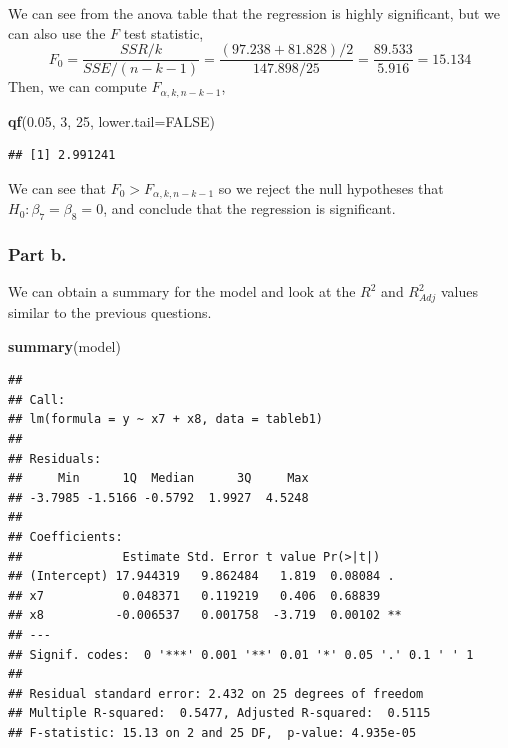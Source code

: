 \documentclass[
  11pt,
]{article}
\newenvironment{Shaded}{\begin{snugshade}}{\end{snugshade}}
\newcommand{\AttributeTok}[1]{\textcolor[rgb]{0.13,0.29,0.53}{#1}}
\newcommand{\ConstantTok}[1]{\textcolor[rgb]{0.56,0.35,0.01}{#1}}
\newcommand{\DecValTok}[1]{\textcolor[rgb]{0.00,0.00,0.81}{#1}}
\newcommand{\FloatTok}[1]{\textcolor[rgb]{0.00,0.00,0.81}{#1}}
\newcommand{\FunctionTok}[1]{\textcolor[rgb]{0.13,0.29,0.53}{\textbf{#1}}}
\newcommand{\NormalTok}[1]{#1}
\begin{document}
We can see from the anova table that the regression is highly
significant, but we can also use the \(F\) test statistic,
\[F_0 = \frac{SSR/k}{SSE/(n-k-1)} = \frac{(97.238 + 81.828)/2}{147.898/25} = \frac{89.533}{5.916} = 15.134\]
Then, we can compute \(F_{\alpha, k, n-k-1}\),

\begin{Shaded}
\begin{Highlighting}[]
\FunctionTok{qf}\NormalTok{(}\FloatTok{0.05}\NormalTok{, }\DecValTok{3}\NormalTok{, }\DecValTok{25}\NormalTok{, }\AttributeTok{lower.tail=}\ConstantTok{FALSE}\NormalTok{)}
\end{Highlighting}
\end{Shaded}

\begin{verbatim}
## [1] 2.991241
\end{verbatim}

We can see that \(F_0 > F_{\alpha, k, n-k-1}\) so we reject the null
hypotheses that \(H_0: \beta_7 = \beta_8 = 0\), and conclude that the
regression is significant.

\subsubsection{Part b.}\label{part-b.-3}

We can obtain a summary for the model and look at the \(R^2\) and
\(R_{Adj}^2\) values similar to the previous questions.

\begin{Shaded}
\begin{Highlighting}[]
\FunctionTok{summary}\NormalTok{(model)}
\end{Highlighting}
\end{Shaded}

\begin{verbatim}
## 
## Call:
## lm(formula = y ~ x7 + x8, data = tableb1)
## 
## Residuals:
##     Min      1Q  Median      3Q     Max 
## -3.7985 -1.5166 -0.5792  1.9927  4.5248 
## 
## Coefficients:
##              Estimate Std. Error t value Pr(>|t|)   
## (Intercept) 17.944319   9.862484   1.819  0.08084 . 
## x7           0.048371   0.119219   0.406  0.68839   
## x8          -0.006537   0.001758  -3.719  0.00102 **
## ---
## Signif. codes:  0 '***' 0.001 '**' 0.01 '*' 0.05 '.' 0.1 ' ' 1
## 
## Residual standard error: 2.432 on 25 degrees of freedom
## Multiple R-squared:  0.5477, Adjusted R-squared:  0.5115 
## F-statistic: 15.13 on 2 and 25 DF,  p-value: 4.935e-05
\end{verbatim}
\end{document}
